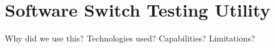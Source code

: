 \chapter{Software Switch Testing Utility}
Why did we use this?
Technologies used?
Capabilities?
Limitations?
